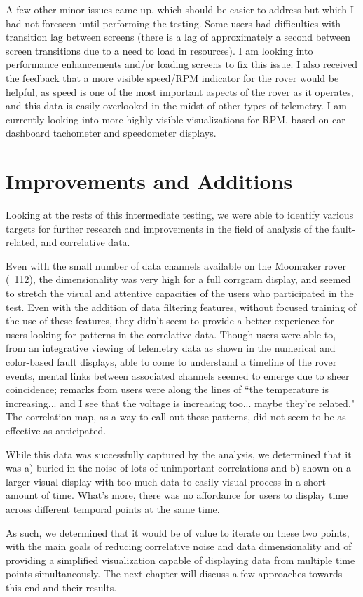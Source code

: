 A few other minor issues came up, which should be easier to address but which I had not foreseen until performing the testing. Some users had difficulties with transition lag between screens (there is a lag of approximately a second between screen transitions due to a need to load in resources). I am looking into performance enhancements and/or loading screens to fix this issue. I also received the feedback that a more visible speed/RPM indicator for the rover would be helpful, as speed is one of the most important aspects of the rover as it operates, and this data is easily overlooked in the midst of other types of telemetry. I am currently looking into more highly-visible visualizations for RPM, based on car dashboard tachometer and speedometer displays.

\section{Improvements and Additions}

Looking at the rests of this intermediate testing, we were able to identify various targets for further research and improvements in the field of analysis of the fault-related, and correlative data.

Even with the small number of data channels available on the Moonraker rover (~112), the dimensionality was very high for a full corrgram display, and seemed to stretch the visual and attentive capacities of the users who participated in the test. Even with the addition of data filtering features, without focused training of the use of these features, they didn't seem to provide a better experience for users looking for patterns in the correlative data. Though users were able to, from an integrative viewing of telemetry data as shown in the numerical and color-based fault displays, able to come to understand a timeline of the rover events, mental links between associated channels seemed to emerge due to sheer coincidence; remarks from users were along the lines of ``the temperature is increasing... and I see that the voltage is increasing too... maybe they're related." The correlation map, as a way to call out these patterns, did not seem to be as effective as anticipated.

While this data was successfully captured by the analysis, we determined that it was a) buried in the noise of lots of unimportant correlations and b) shown on a larger visual display with too much data to easily visual process in a short amount of time. What's more, there was no affordance for users to display time across different temporal points at the same time.

As such, we determined that it would be of value to iterate on these two points, with the main goals of reducing correlative noise and data dimensionality and of providing a simplified visualization capable of displaying data from multiple time points simultaneously. The next chapter will discuss a few approaches towards this end and their results.
